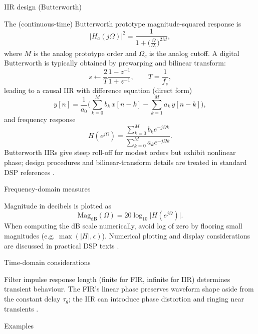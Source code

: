 \documentclass[11pt]{article}
\begin{document}
\bigskip

\noindent IIR design (Butterworth)

The (continuous-time) Butterworth prototype magnitude-squared response is
\[
    |H_a(j\Omega)|^2 = \frac{1}{1 + \big(\tfrac{\Omega}{\Omega_c}\big)^{2M}},
\]
where $M$ is the analog prototype order and $\Omega_c$ is the analog cutoff. A digital Butterworth is typically obtained by prewarping and bilinear transform:
\[
    s \leftarrow \frac{2}{T}\frac{1-z^{-1}}{1+z^{-1}},\qquad T=\frac{1}{f_s},
\]
leading to a causal IIR with difference equation (direct form)
\[
    y[n] = \frac{1}{a_0}\Big(\sum_{k=0}^{M} b_k\,x[n-k] - \sum_{k=1}^{M} a_k\,y[n-k]\Big),
\]
and frequency response
\[
    H(e^{j\Omega}) = \frac{\sum_{k=0}^{M} b_k e^{-j\Omega k}}{\sum_{k=0}^{M} a_k e^{-j\Omega k}}.
\]
Butterworth IIRs give steep roll-off for modest orders but exhibit nonlinear phase; design procedures and bilinear-transform details are treated in standard DSP references \cite{proakis2006,oppenheim1999}.

\bigskip

\noindent Frequency-domain measures

Magnitude in decibels is plotted as
\[
    \mathrm{Mag}_{\mathrm{dB}}(\Omega)=20\log_{10}\big|H(e^{j\Omega})\big|.
\]
When computing the dB scale numerically, avoid log of zero by flooring small magnitudes (e.g. $ \max(|H|,\epsilon)$). Numerical plotting and display considerations are discussed in practical DSP texts \cite{lyons2011}.

\bigskip

\noindent Time-domain considerations

Filter impulse response length (finite for FIR, infinite for IIR) determines transient behaviour. The FIR's linear phase preserves waveform shape aside from the constant delay $\tau_g$; the IIR can introduce phase distortion and ringing near transients \cite{proakis2006,oppenheim1999}.

\bigskip

\noindent Examples
\end{document}
